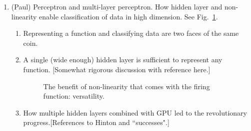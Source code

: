 \documentclass[aps,prb,floatfix,amsmath,amssymb,amsfonts,10pt,floatfix,longbibliography]{revtex4-1}
\begin{document}
\begin{enumerate}
\item (Paul) Perceptron and multi-layer perceptron. How hidden layer and non-linearity enable classification of data in high dimension. See Fig.~\ref{fig:non-linearity}. 
\begin{enumerate}
	\item Representing a function and classifying data are two faces of the same coin.
	\item A single (wide enough) hidden layer is sufficient to represent any function. {\color{blue}[Somewhat rigorous discussion with reference here.]}
	\begin{figure}[h]
	\centering
	\hfill
	\hfill
	\caption{\label{fig:non-linearity} The benefit of non-linearity that comes with the firing function: versatility.}
	\end{figure}
	\item How multiple hidden layers combined with GPU led to the revolutionary progress.{\color{blue}[References to Hinton and ``successes".]}
\end{enumerate}


\end{enumerate}
\end{document}
